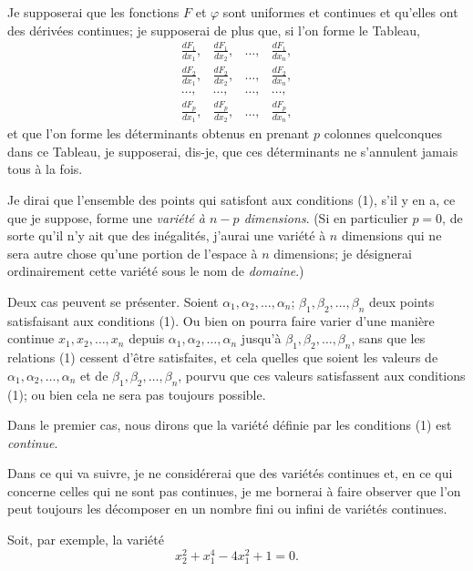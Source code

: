 \documentclass{article}
\begin{document}
Je supposerai que les fonctions $F$ et $\varphi$ sont uniformes et continues et qu'elles ont des dérivées continues; je supposerai de plus que, si l'on forme le Tableau,
\[
\begin{matrix}
\frac{dF_{1}}{dx_{1}}, & \frac{dF_{1}}{dx_{2}}, & \ldots, & \frac{dF_{1}}{dx_{n}},\\[1ex]
\frac{dF_{2}}{dx_{1}}, & \frac{dF_{2}}{dx_{2}}, & \ldots, & \frac{dF_{2}}{dx_{n}},\\[1ex]
\ldots, & \ldots, & \ldots, & \ldots,\\[1ex]
\frac{dF_{p}}{dx_{1}}, & \frac{dF_{p}}{dx_{2}}, & \ldots, & \frac{dF_{p}}{dx_{n}},
\end{matrix}
\]
et que l'on forme les déterminants obtenus en prenant $p$ colonnes quelconques
dans ce Tableau, je supposerai, dis-je, que ces déterminants ne s'annulent jamais tous à la fois.

Je dirai que l'ensemble des points qui satisfont aux conditions (1), s'il y en a, ce que je suppose, forme une \emph{variété à $n-p$ dimensions}. (Si en particulier $p = 0$, de sorte qu'il n'y ait que des inégalités, j'aurai une variété à $n$ dimensions qui ne sera autre chose qu'une portion de l'espace à $n$ dimensions; je désignerai ordinairement cette variété sous le nom de \emph{domaine}.)

Deux cas peuvent se présenter. Soient $\alpha_{1}, \alpha_{2}, \ldots, \alpha_{n}$; $\beta_{1}, \beta_{2}, \ldots, \beta_{n}$ deux points satisfaisant aux conditions (1). Ou bien on pourra faire varier d'une manière continue $x_{1}, x_{2}, \ldots, x_{n}$ depuis $\alpha_{1}, \alpha_{2}, \ldots, \alpha_{n}$ jusqu'à $\beta_{1}, \beta_{2}, \ldots, \beta_{n}$, sans que les relations (1) cessent d'être satisfaites, et cela quelles que soient les valeurs de $\alpha_{1}, \alpha_{2}, \ldots, \alpha_{n}$ et de $\beta_{1}, \beta_{2}, \ldots, \beta_{n}$, pourvu que ces valeurs satisfassent aux conditions (1); ou bien cela ne sera pas toujours possible.

Dans le premier cas, nous dirons que la variété définie par les conditions (1) est \emph{continue}.

Dans ce qui va suivre, je ne considérerai que des variétés continues et, en ce qui concerne celles qui ne sont pas continues, je me bornerai à faire observer que l'on peut toujours les décomposer en un nombre fini ou infini de variétés continues.

Soit, par exemple, la variété
\[
x^{2}_{2} + x^{4}_{1} - 4x^{2}_{1} + 1 = 0.
\]
\end{document}
